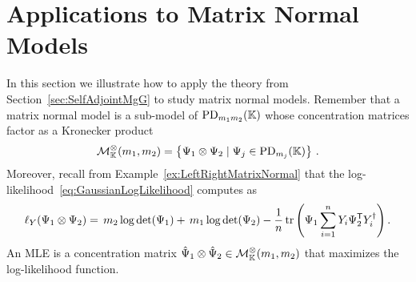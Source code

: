 \section{Applications to Matrix Normal Models}\label{sec:MatrixNormalModels}


In this section we illustrate how to apply the theory from Section~\ref{sec:SelfAdjointMgG} to study matrix normal models.
Remember that a matrix normal model is a sub-model of $\operatorname{PD}_{m_1 m_2}(\mathbb K)$ whose concentration matrices factor as a Kronecker product
	\[ \mathcal{M}^{\otimes}_{\mathbb{K}}(m_1, m_2) = \left\lbrace \Psi_1 \otimes \Psi_2 \mid \Psi_j \in \operatorname{PD}_{m_j}(\mathbb K) \right\rbrace \, . \]
Moreover, recall from Example~\ref{ex:LeftRightMatrixNormal} that the log-likelihood~\eqref{eq:GaussianLogLikelihood} computes as
\begin{equation} \label{eq:MatrixNormalLikelihood} 
	\ell_Y(\Psi_1 \otimes \Psi_2) =  \, m_2 \log \det (\Psi_1) +  \, m_1 \log \det (\Psi_2)
	- \frac{1}{n} \operatorname{tr} \left( \Psi_1 \sum_{i=1}^n Y_i \Psi_2^{\mathsf{T}} Y_i^{\dagger} \right).
\end{equation}
An MLE is a concentration matrix $\hat{\Psi}_1 \otimes \hat{\Psi}_2 \in \mathcal{M}^{\otimes}_{\mathbb{K}}(m_1, m_2)$ that maximizes the log-likelihood function.

